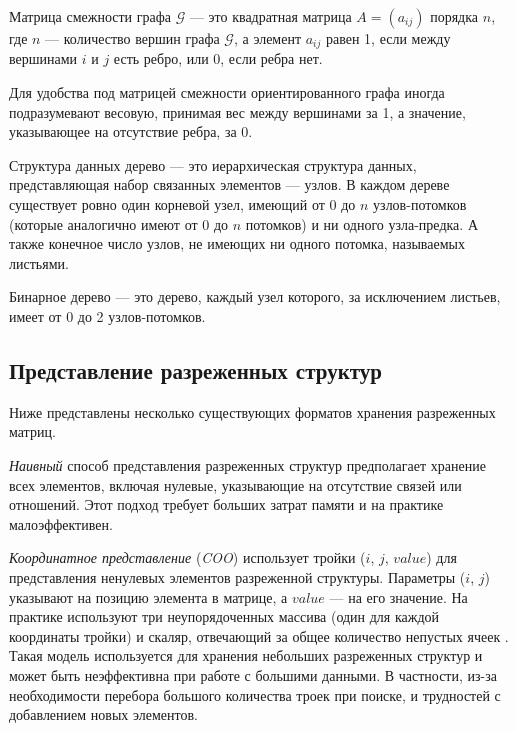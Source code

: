 \begin{definition}
Матрица смежности графа $\mathcal{G}$ --- это квадратная матрица $A = (a_{ij})$ порядка $n$, где $n$ --- количество вершин графа $\mathcal{G}$, а элемент $a_{ij}$ равен 1, если между вершинами $i$ и $j$ есть ребро, или 0, если ребра нет.
\end{definition}

\begin{remark}
Для удобства под матрицей смежности ориентированного графа иногда подразумевают весовую, принимая вес между вершинами за 1, а значение, указывающее на отсутствие ребра, за 0.     
\end{remark}

\begin{definition}
Структура данных дерево --- это иерархическая структура данных, представляющая набор связанных элементов --- узлов. В каждом дереве существует ровно один корневой узел, имеющий от 0 до $n$ узлов-потомков (которые аналогично имеют от 0 до $n$ потомков) и ни одного узла-предка. А также конечное число узлов, не имеющих ни одного потомка, называемых листьями.
\end{definition}

\begin{definition}
Бинарное дерево --- это дерево, каждый узел которого, за исключением листьев, имеет от 0 до 2 узлов-потомков.
\end{definition}

\subsection{Представление разреженных структур}

Ниже представлены несколько существующих форматов хранения разре\-жен\-ных матриц.

\textit{Наивный} способ представления разреженных структур предполагает хранение всех элементов, включая нулевые, указывающие на отсутствие связей или отношений. Этот подход требует больших затрат памяти и на практике малоэффективен.

\textit{Координатное представление} (\textit{COO}) использует тройки ($i$, $j$, $value$) для представления ненулевых элементов разреженной структуры. Параметры ($i$, $j$) указывают на позицию элемента в матрице, а $value$ --- на его значение. На практике используют три неупорядоченных массива (один для каждой координаты тройки) и скаляр, отвечающий за общее количество непустых ячеек \cite{stanimirovic2009performance}. Такая модель используется для хранения небольших разреженных структур и может быть неэффективна при работе с большими данными. В частности, из-за необходимости перебора большого количества троек при поиске, и трудностей с добавлением новых элементов.

